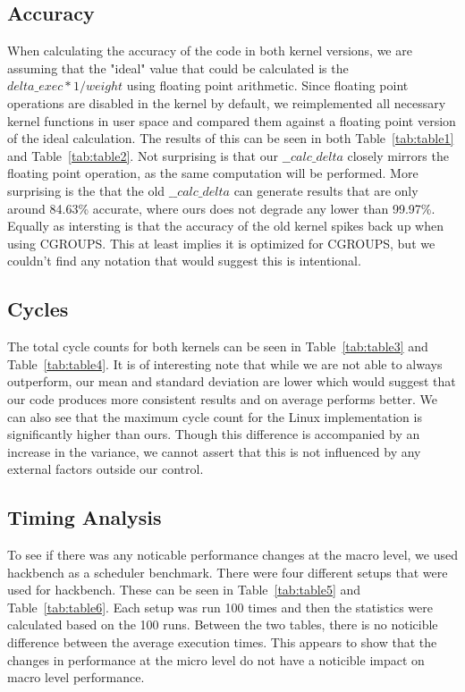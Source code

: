 \documentclass[10pt, conference]{IEEEtran}
\begin{document}
\subsection{Accuracy}
When calculating the accuracy of the code in both kernel versions, we are assuming that the "ideal" value that could be calculated is the $delta\_exec * 1 / weight$ using floating point arithmetic. Since floating point operations are disabled in the kernel by default, we reimplemented all necessary kernel functions in user space and compared them against a floating point version of the ideal calculation. The results of this can be seen in both Table~\ref{tab:table1} and Table~\ref{tab:table2}. Not surprising is that our  $\_\_calc\_delta$ closely mirrors the floating point operation, as the same computation will be performed. More surprising is the that the old  $\_\_calc\_delta$ can generate results that are only around 84.63\% accurate, where ours does not degrade any lower than 99.97\%. Equally as intersting is that the accuracy of the old kernel spikes back up when using CGROUPS. This at least implies it is optimized for CGROUPS, but we couldn't find any notation that would suggest this is intentional.

\subsection{Cycles}
The total cycle counts for both kernels can be seen in Table~\ref{tab:table3} and Table~\ref{tab:table4}. It is of interesting note that while we are not able to always outperform, our mean and standard deviation are lower which would suggest that our code produces more consistent results and on average performs better.  We can also see that the maximum cycle count for the Linux implementation is significantly higher than ours.  Though this difference is accompanied by an increase in the variance, we cannot assert that this is not influenced by any external factors outside our control.

\subsection{Timing Analysis}
To see if there was any noticable performance changes at the macro level, we used hackbench as a scheduler benchmark. There were four different setups that were used for hackbench. These can be seen in Table~\ref{tab:table5} and Table~\ref{tab:table6}. Each setup was run 100 times and then the statistics were calculated based on the 100 runs. Between the two tables, there is no noticible difference between the average execution times. This appears to show that the changes in performance at the micro level do not have a noticible impact on macro level performance. 
\end{document}
